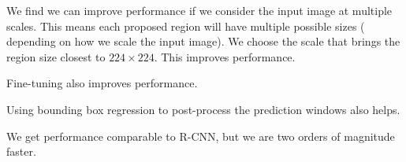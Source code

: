 \documentclass[a4paper]{article}
\begin{document}
We find we can improve performance if we consider the input image at multiple
scales. This means each proposed region will have multiple possible sizes (
depending on how we scale the input image). We choose the scale that brings
the region size closest to $224 \times 224$. This improves performance.

Fine-tuning also improves performance.

Using bounding box regression to post-process the prediction windows also helps.

We get performance comparable to R-CNN, but we are two orders of magnitude
faster.
\end{document}
